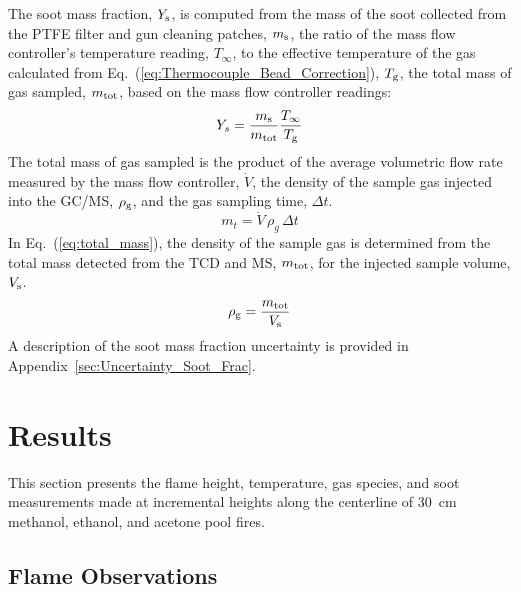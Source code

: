 \documentclass[12pt]{article}
\begin{document}
The soot mass fraction, $Y_{\rm s}$, is computed from the mass of the soot collected from the PTFE filter and gun cleaning patches, $m_{\rm s}$, the ratio of the mass flow controller's temperature reading, $T_{\infty}$, to the effective temperature of the gas calculated from Eq.~(\ref{eq:Thermocouple_Bead_Correction}), $T_{\rm g}$, the total mass of gas sampled, $m_{\rm tot}$, based on the mass flow controller readings:
\begin{equation}\label{eq:soot_mass_frac}
Y_{s}= \frac{m_{\rm s}}{m_{\rm tot}}\frac{T_{\infty}}{T_{\rm g}}
\end{equation}
The total mass of gas sampled is the product of the average volumetric flow rate measured by the mass flow controller, $\dot{V}$, the density of the sample gas injected into the GC/MS, $\rho_{\rm g}$, and the gas sampling time, $\Delta t$.
\begin{equation}\label{eq:total_mass}
m_{t}= \dot{V} \, \rho_{g}\, \Delta t
\end{equation}
In Eq.~(\ref{eq:total_mass}), the density of the sample gas is determined from the total mass detected from the TCD and MS, $m_{\rm tot}$, for the injected sample volume, $V_{\rm s}$.
\begin{equation}\label{eq:gas_density}
\rho_{\rm g}= \frac{m_{\rm tot}}{V_{\rm s}}
\end{equation}
A description of the soot mass fraction uncertainty is provided in Appendix~\ref{sec:Uncertainty_Soot_Frac}.




\clearpage

\section{Results}
\label{sec:Results}

This section presents the flame height, temperature, gas species, and soot measurements made at incremental heights along the centerline of 30~cm methanol, ethanol, and acetone pool fires.

\subsection{Flame Observations}
\label{ssec:Flame_Observations}
\end{document}
